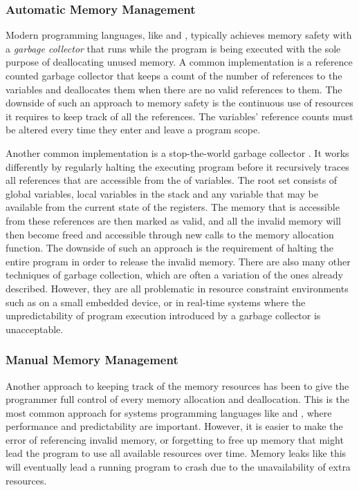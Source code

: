 \subsubsection{Automatic Memory Management}
Modern programming languages, like {\Java} and {}, typically achieves memory safety with a \emph{garbage collector} that runs while the program is being executed with the sole purpose of deallocating unused memory.
A common implementation is a reference counted garbage collector \cite{Wilson1992} that keeps a count of the number of references to the variables and deallocates them when there are no valid references to them.
The downside of such an approach to memory safety is the continuous use of resources it requires to keep track of all the references.
The variables' reference counts must be altered every time they enter and leave a program scope.

Another common implementation is a stop-the-world garbage collector \cite{Wilson1992}.
It works differently by regularly halting the executing program before it recursively traces all references that are accessible from the  of variables.
The root set consists of global variables, local variables in the stack and any variable that may be available from the current state of the registers.
The memory that is accessible from these references are then marked as valid, and all the invalid memory will then become freed and accessible through new calls to the memory allocation function.
The downside of such an approach is the requirement of halting the entire program in order to release the invalid memory.
There are also many other techniques of garbage collection, which are often a variation of the ones already described.
However, they are all problematic in resource constraint environments such as on a small embedded device, or in real-time systems where the unpredictability of program execution introduced by a garbage collector is unacceptable.

\subsubsection{Manual Memory Management}

Another approach to keeping track of the memory resources has been to give the programmer full control of every memory allocation and deallocation.
This is the most common approach for systems programming languages like {\C} and {\Cpp}, where performance and predictability are important.
However, it is easier to make the error of referencing invalid memory, or forgetting to free up memory that might lead the program to use all available resources over time.
Memory leaks like this will eventually lead a running program to crash due to the unavailability of extra resources.

